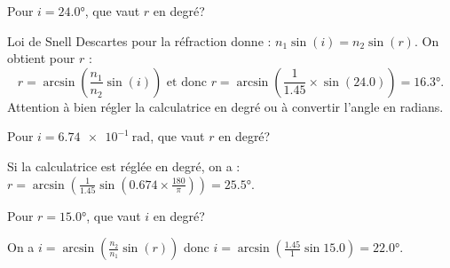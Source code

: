 	
	\debutEntrainement
	
	
	
	
	
	\begin{enonce}
		Pour $i=\ang{24.0}$, que vaut $r$ en degré? 
	\end{enonce}
	
	
	\begin{corrige}
		Loi de Snell Descartes pour la réfraction donne : $n_1\sin(i)=n_2\sin(r)$. On obtient pour $r$ : 
		\[
		r=\arcsin\left(\frac{n_1}{n_2}\sin(i)\right) \text{ et donc } r=\arcsin\left(\frac{1}{\num{1.45}}\times\sin(\num{24.0})\right)=\ang{16.3}.
		\] 
		Attention à bien régler la calculatrice en degré ou à convertir l'angle en radians.
	\end{corrige}
	
	
	
	\begin{enonce}
		Pour $i=\SI{6.74e-1}{\radian}$, que vaut $r$ en degré? 
	\end{enonce}
	
	
	\begin{corrige}
		Si la calculatrice est réglée en degré, on a :  $r=\arcsin\left(\frac{1}{\num{1.45}}\sin(\num{0.674}\times \frac{180}{\pi})\right)=\ang{25.5}$. 
	\end{corrige}
	
	
	\begin{enonce}
		Pour $r=\ang{15.0}$, que vaut $i$ en degré? 
	\end{enonce}
	
	
	\begin{corrige}
		On a $i=\arcsin\left(\frac{n_2}{n_1}\sin(r)\right)$ donc $i=\arcsin\left(\frac{\num{1.45}}{1}\sin{\num{15.0}}\right)=\ang{22.0}$.
	\end{corrige}
	
